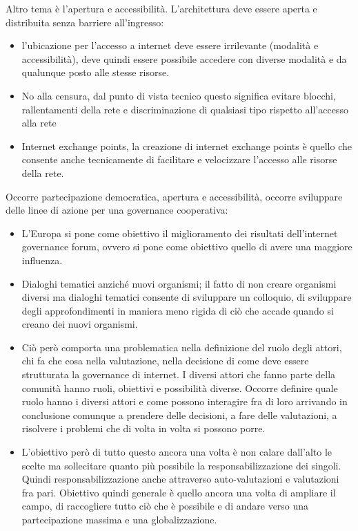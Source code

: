 \par
Altro tema è l'apertura e accessibilità. 
L'architettura deve essere aperta e distribuita senza barriere all'ingresso:
\begin{itemize}
    \item l'ubicazione per l'accesso a internet deve essere irrilevante (modalità e accessibilità), deve quindi essere possibile accedere con diverse modalità e da qualunque posto alle stesse risorse. 
    \item No alla censura, dal punto di vista tecnico questo significa evitare blocchi, rallentamenti della rete e discriminazione di qualsiasi tipo rispetto all'accesso alla rete 
    \item Internet exchange points, la creazione di internet exchange points è quello che consente anche tecnicamente di facilitare e velocizzare l'accesso alle risorse della rete. \end{itemize} 
    \par
    Occorre partecipazione democratica, apertura e accessibilità,  occorre sviluppare delle linee di azione per una governance cooperativa:
    \begin{itemize}
        \item  L'Europa si pone come obiettivo il miglioramento dei risultati dell'internet governance forum, ovvero si pone come obiettivo quello di avere una maggiore influenza. 
        \item Dialoghi tematici anziché nuovi organismi; il fatto di non creare organismi diversi ma dialoghi tematici consente di sviluppare un colloquio, di sviluppare degli approfondimenti in maniera meno rigida di ciò che accade quando si creano dei nuovi organismi. 
        \item Ciò però comporta una problematica nella definizione del ruolo degli attori, chi fa che cosa nella valutazione, nella decisione di come deve essere strutturata la governance di internet. I diversi attori che fanno parte della comunità hanno ruoli, obiettivi e possibilità diverse. Occorre definire quale ruolo hanno i diversi attori e come possono interagire fra di loro arrivando in conclusione comunque a prendere delle decisioni, a fare delle valutazioni, a risolvere i problemi che di volta in volta si possono porre.
        \item L'obiettivo però di tutto questo ancora una volta è non calare dall'alto le scelte ma sollecitare quanto più possibile la responsabilizzazione dei singoli. Quindi responsabilizzazione anche attraverso auto-valutazioni e valutazioni fra pari. Obiettivo quindi generale è quello ancora una volta di ampliare il campo, di raccogliere tutto ciò che è possibile e di andare verso una partecipazione massima e una globalizzazione. 
\end{itemize}
\par %
